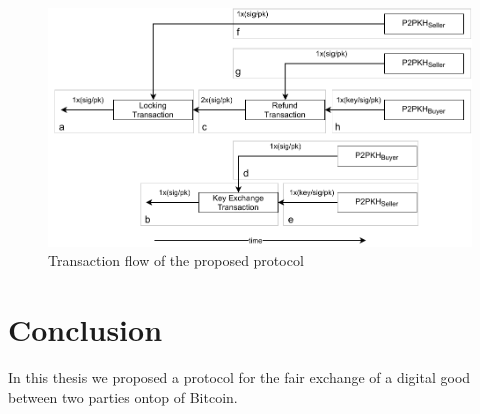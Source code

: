 \documentclass{cacthesis}
\newcounter{protocol}
\begin{document}
	    
	    \begin{figure}
            \begin{center}
                \includegraphics[width=\textwidth]{images/transaction_flow.pdf}
              \caption{Transaction flow of the proposed protocol}
              \label{fig:transactionFlow}
            \end{center}
        \end{figure}
	    
	\chapter{Conclusion}
	\label{sec:Conclusion}
    In this thesis we proposed a protocol for the fair exchange of a digital good between two parties ontop of Bitcoin. 
	
	\newpage
    
    
	
	\appendix
\end{document}
